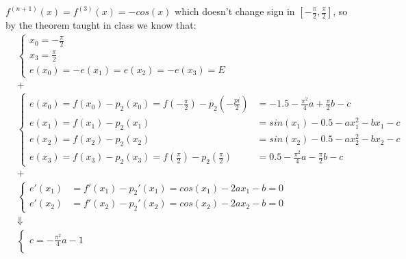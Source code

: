 \documentclass[conference,onecolumn]{IEEEtran}
\begin{document}
\begin{enumerate}[label=\arabic{enumi}.]
\begin{enumerate}
                        $f^{(n + 1)}(x) = f^{(3)}(x) = - cos(x)$ which doesn't change sign in $[-\frac{\pi}{2}, \frac{\pi}{2}]$, so by the theorem taught in class we know that:
                        \begin{align*}
                               & \begin{cases}
                                    x_0 = -\frac{\pi}{2} \\
                                    x_3 = \frac{\pi}{2}  \\
                                    e(x_0) = - e(x_1) = e(x_2) = - e(x_3) = E
                              \end{cases} \\
                               & +                         \\
                               & \begin{cases}
                                    e(x_0) = f(x_0) - p_2(x_0) = f(-\frac{\pi}{2}) - p_2(-\frac{pi}{2}) & = -1.5 - \frac{\pi^2}{4}a + \frac{\pi}{2}b - c \\
                                    e(x_1) = f(x_1) - p_2(x_1)                                          & = sin(x_1) - 0.5 - a x_1^2 - b x_1 - c         \\
                                    e(x_2) = f(x_2) - p_2(x_2)                                          & = sin(x_2) - 0.5 - a x_2^2 - b x_2 - c         \\
                                    e(x_3) = f(x_3) - p_2(x_3) = f(\frac{\pi}{2}) - p_2(\frac{\pi}{2})  & = 0.5 - \frac{\pi^2}{4}a - \frac{\pi}{2}b - c
                              \end{cases} \\
                               & +                         \\
                               & \begin{cases}
                                    e'(x_1) & = f'(x_1) - p_2'(x_1) = cos(x_1) - 2 a x_1 - b = 0 \\
                                    e'(x_2) & = f'(x_2) - p_2'(x_2) = cos(x_2) - 2 a x_2 - b = 0
                              \end{cases} \\
                               & \Downarrow                \\
                               & \begin{cases}
                                    c = -\frac{\pi^2}{4}a - 1 \\

\end{cases}
\end{align*}
\end{enumerate}
\end{enumerate}
\end{document}
